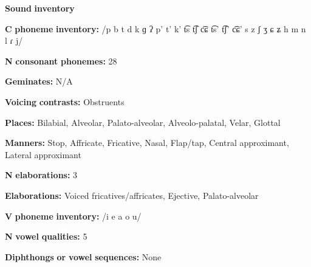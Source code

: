 \documentclass[output=paper]{langsci/langscibook}
\begin{document}
\begin{styleBody}
\textbf{Sound} \textbf{inventory}
\end{styleBody}

\begin{styleBody}
\textbf{C} \textbf{phoneme} \textbf{inventory:} /p b t d k ɡ ʔ p’ t’ k’ t͡s t͡ʃ c͡ɕ t͡s’ t͡ʃ’ c͡ɕ’ s z ʃ ʒ ɕ ʑ h m n l ɾ j/
\end{styleBody}

\begin{styleBody}
\textbf{N} \textbf{consonant} \textbf{phonemes:} 28
\end{styleBody}

\begin{styleBody}
\textbf{Geminates:} N/A
\end{styleBody}

\begin{styleBody}
\textbf{Voicing} \textbf{contrasts:} Obstruents
\end{styleBody}

\begin{styleBody}
\textbf{Places:} Bilabial, Alveolar, Palato-alveolar, Alveolo-palatal, Velar, Glottal
\end{styleBody}

\begin{styleBody}
\textbf{Manners:} Stop, Affricate, Fricative, Nasal, Flap/tap, Central approximant, Lateral approximant
\end{styleBody}

\begin{styleBody}
\textbf{N} \textbf{elaborations:} 3
\end{styleBody}

\begin{styleBody}
\textbf{Elaborations:} Voiced fricatives/affricates, Ejective, Palato-alveolar
\end{styleBody}

\begin{styleBody}
\textbf{V} \textbf{phoneme} \textbf{inventory:} /i e a o u/
\end{styleBody}

\begin{styleBody}
\textbf{N} \textbf{vowel} \textbf{qualities:} 5
\end{styleBody}

\begin{styleBody}
\textbf{Diphthongs} \textbf{or} \textbf{vowel} \textbf{sequences:} None
\end{styleBody}
\end{document}
